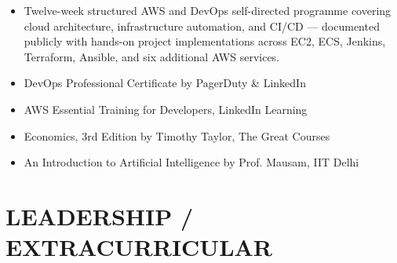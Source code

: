 \documentclass[letterpaper,11pt]{article}
\begin{document}
\begin{itemize}[itemsep=1pt, parsep=1pt, before=\vspace{1pt}]
    \item Twelve-week structured AWS and DevOps self-directed programme covering cloud architecture, infrastructure automation, and CI/CD — documented publicly with hands-on project implementations across EC2, ECS, Jenkins, Terraform, Ansible, and six additional AWS services.
    \item DevOps Professional Certificate by PagerDuty \& LinkedIn
    \item AWS Essential Training for Developers, LinkedIn Learning
    \item Economics, 3rd Edition by Timothy Taylor, The Great Courses
    \item An Introduction to Artificial Intelligence by Prof. Mausam, IIT Delhi
\end{itemize}


\section{LEADERSHIP / EXTRACURRICULAR}
\end{document}
